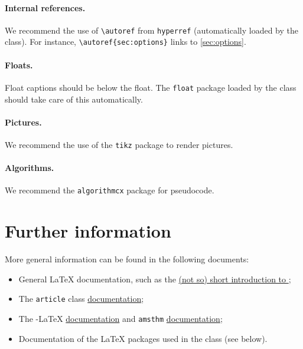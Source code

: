 \documentclass[preprint]{iacrtrans}
\begin{document}
\paragraph{Internal references.}

We recommend the use of \verb+\autoref+ from \texttt{hyperref}
(automatically loaded by the class).  For instance,
\verb+\autoref{sec:options}+ links to \autoref{sec:options}.

\paragraph{Floats.}

Float captions should be below the float.  The \texttt{float} package
loaded by the class should take care of this automatically.

\paragraph{Pictures.}

We recommend the use of the \texttt{tikz} package to render pictures.

\paragraph{Algorithms.}

We recommend the \texttt{algorithmcx} package for pseudocode.

\section{Further information}

More general information can be found in the following documents:
\begin{itemize}
\item General \LaTeX{} documentation, such as the
  \href{http://mirrors.ctan.org/info/lshort/english/lshort.pdf}{(not
    so) short introduction to \LaTeXe};
\item The \texttt{article} class
  \href{http://mirrors.ctan.org/macros/latex/doc/clsguide.pdf}{documentation};
\item The \AmS-\LaTeX{}
  \href{http://mirrors.ctan.org/macros/latex/required/amslatex/math/amsldoc.pdf}{documentation}
  and \texttt{amsthm} \href{ftp://ftp.ams.org/pub/tex/doc/amscls/amsthdoc.pdf}{documentation};
\item Documentation of the \LaTeX{} packages used in the class (see below).
\end{itemize}
\end{document}
